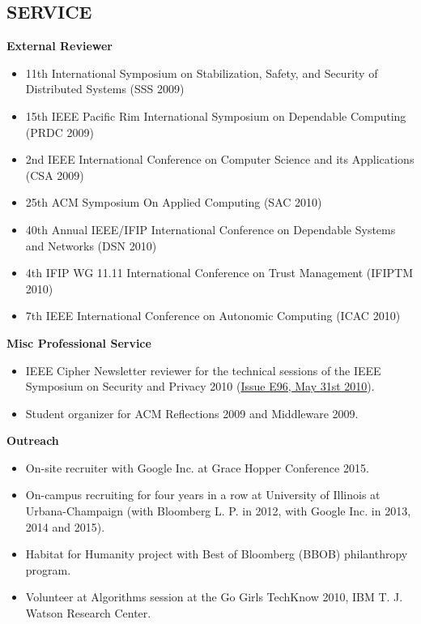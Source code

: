 \documentclass[line,margin]{res}
\begin{document}
\begin{resume}
\section{SERVICE}
	       \textbf{External Reviewer}
                \begin{itemize}  \itemsep -2pt	       
                \item 11th International Symposium on Stabilization, Safety, and Security of Distributed Systems (SSS 2009)
                \item15th IEEE Pacific Rim International Symposium on Dependable Computing (PRDC 2009)
                \item 2nd IEEE International Conference on Computer Science and its Applications (CSA 2009)
                \item 25th ACM Symposium On Applied Computing (SAC 2010)
                \item 40th Annual IEEE/IFIP International Conference on Dependable Systems and Networks (DSN 2010) 
                \item 4th IFIP WG 11.11 International Conference on Trust Management (IFIPTM 2010)
                \item 7th IEEE International Conference on Autonomic Computing (ICAC 2010)
                \end{itemize}
                \textbf{Misc Professional Service}
                \begin{itemize}  \itemsep -2pt
               \item IEEE Cipher Newsletter reviewer for the technical sessions of the IEEE Symposium on Security and Privacy 2010 (\href{http://www.ieee-security.org/Cipher/PastIssues/2010/E96.May-2010/E96.May-2010.html}{Issue E96, May 31st 2010}).
               \item Student organizer for ACM Reflections 2009 and Middleware 2009.
               \end{itemize}   
               \textbf{Outreach}
               \begin{itemize}  \itemsep -2pt
              \item On-site recruiter with Google Inc. at Grace Hopper Conference 2015.
	      \item On-campus recruiting for four years in a row at University of Illinois at Urbana-Champaign (with Bloomberg L. P. in 2012, with Google Inc. in 2013, 2014 and 2015).
	      \item Habitat for Humanity project with Best of Bloomberg (BBOB) philanthropy program.
	      \item Volunteer at Algorithms session at the Go Girls TechKnow 2010, IBM T. J. Watson Research Center.

\end{itemize}
\end{resume}
\end{document}
